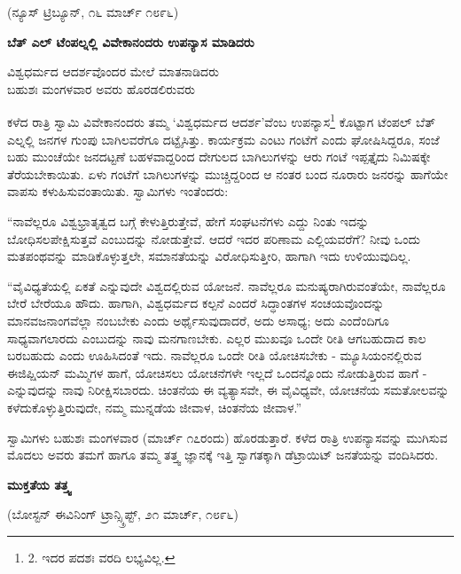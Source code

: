 \begin{center}
(ನ್ಯೂಸ್ ಟ್ರಿಬ್ಯೂನ್, ೧೬ ಮಾರ್ಚ್ ೧೮೯೬)
\end{center}

\begin{center}
\textbf{ಬೆತ್ ಎಲ್ ಟೆಂಪಲ್ನಲ್ಲಿ ವಿವೇಕಾನಂದರು ಉಪನ್ಯಾಸ ಮಾಡಿದರು}
\end{center}

\begin{myquote}
ವಿಶ್ವಧರ್ಮದ ಆದರ್ಶವೊಂದರ ಮೇಲೆ ಮಾತನಾಡಿದರು\\ಬಹುಶಃ ಮಂಗಳವಾರ ಅವರು ಹೊರಡಲಿರುವರು
\end{myquote}

ಕಳೆದ ರಾತ್ರಿ ಸ್ವಾಮಿ ವಿವೇಕಾನಂದರು ತಮ್ಮ ‘ವಿಶ್ವಧರ್ಮದ ಆದರ್ಶ’ವೆಂಬ ಉಪನ್ಯಾಸ\footnote{2. ಇದರ ಪದಶಃ ವರದಿ ಲಭ್ಯವಿಲ್ಲ.} ಕೊಟ್ಟಾಗ ಟೆಂಪಲ್ ಬೆತ್ ಎಲ್ನಲ್ಲಿ ಜನಗಳ ಗುಂಪು ಬಾಗಿಲವರೆಗೂ ದಟ್ಟೈಸಿತ್ತು. ಕಾರ್ಯಕ್ರಮ ಎಂಟು ಗಂಟೆಗೆ ಎಂದು ಘೋಷಿಸಿದ್ದರೂ, ಸಂಜೆ ಬಹು ಮುಂಚೆಯೇ ಜನದಟ್ಟಣೆ ಬಹಳವಾದ್ದರಿಂದ ದೇಗುಲದ ಬಾಗಿಲುಗಳನ್ನು ಆರು ಗಂಟೆ ಇಪ್ಪತ್ತೈದು ನಿಮಿಷಕ್ಕೇ ತೆರೆಯಬೇಕಾಯಿತು. ಏಳು ಗಂಟೆಗೆ ಬಾಗಿಲುಗಳನ್ನು ಮುಚ್ಚಿದ್ದರಿಂದ ಆ ನಂತರ ಬಂದ ನೂರಾರು ಜನರನ್ನು ಹಾಗೆಯೇ ವಾಪಸು ಕಳುಹಿಸುವಂತಾಯಿತು. ಸ್ವಾಮಿಗಳು ಇಂತೆಂದರು:

“ನಾವೆಲ್ಲರೂ ವಿಶ್ವಭ್ರಾತೃತ್ವದ ಬಗ್ಗೆ ಕೇಳುತ್ತಿರುತ್ತೇವೆ, ಹೇಗೆ ಸಂಘಟನೆಗಳು ಎದ್ದು ನಿಂತು ಇದನ್ನು ಬೋಧಿಸಲಪೇಕ್ಷಿಸುತ್ತವೆ ಎಂಬುದನ್ನು ನೋಡುತ್ತೇವೆ. ಆದರೆ ಇದರ ಪರಿಣಾಮ ಎಲ್ಲಿಯವರೆಗೆ? ನೀವು ಒಂದು ಮತಪಂಥವನ್ನು ಮಾಡಿಕೊಳ್ಳುತ್ತಲೇ, ಸಮಾನತೆಯನ್ನು ವಿರೋಧಿಸುತ್ತೀರಿ, ಹಾಗಾಗಿ ಇದು ಉಳಿಯುವುದಿಲ್ಲ.

“ವೈವಿಧ್ಯತೆಯಲ್ಲಿ ಏಕತೆ ಎನ್ನುವುದೇ ವಿಶ್ವದಲ್ಲಿರುವ ಯೋಜನೆ. ನಾವೆಲ್ಲರೂ ಮನುಷ್ಯರಾಗಿರುವಂತೆಯೇ, ನಾವೆಲ್ಲರೂ ಬೇರೆ ಬೇರೆಯೂ ಹೌದು. ಹಾಗಾಗಿ, ವಿಶ್ವಧರ್ಮದ ಕಲ್ಪನೆ ಎಂದರೆ ಸಿದ್ಧಾಂತಗಳ ಸಂಚಯವೊಂದನ್ನು ಮಾನವಜನಾಂಗವೆಲ್ಲಾ ನಂಬಬೇಕು ಎಂದು ಅರ್ಥೈಸುವುದಾದರೆ, ಅದು ಅಸಾಧ್ಯ; ಅದು ಎಂದೆಂದಿಗೂ ಸಾಧ್ಯವಾಗಲಾರದು ಎಂಬುದನ್ನು ನಾವು ಮನಗಾಣಬೇಕು. ಎಲ್ಲರ ಮುಖವೂ ಒಂದೇ ರೀತಿ ಆಗಬಹುದಾದ ಕಾಲ ಬರಬಹುದು ಎಂದು ಊಹಿಸಿದಂತೆ ಇದು. ನಾವೆಲ್ಲರೂ ಒಂದೇ ರೀತಿ ಯೋಚಿಸಬೇಕು - ಮ್ಯೂಸಿಯಂನಲ್ಲಿರುವ ಈಜಿಪ್ಷಿಯನ್ ಮಮ್ಮಿಗಳ ಹಾಗೆ, ಯೋಚಿಸಲು ಯೋಚನೆಗಳೇ ಇಲ್ಲದೆ ಒಂದನ್ನೊಂದು ನೋಡುತ್ತಿರುವ ಹಾಗೆ - ಎನ್ನುವುದನ್ನು ನಾವು ನಿರೀಕ್ಷಿಸಬಾರದು. ಚಿಂತನೆಯ ಈ ವ್ಯತ್ಯಾಸವೇ, ಈ ವೈವಿಧ್ಯವೇ, ಯೋಚನೆಯ ಸಮತೋಲವನ್ನು ಕಳೆದುಕೊಳ್ಳುತ್ತಿರುವುದೇ, ನಮ್ಮ ಮುನ್ನಡೆಯ ಜೀವಾಳ, ಚಿಂತನೆಯ ಜೀವಾಳ.”

ಸ್ವಾಮಿಗಳು ಬಹುಶಃ ಮಂಗಳವಾರ (ಮಾರ್ಚ್ ೧೭ರಂದು) ಹೊರಡುತ್ತಾರೆ. ಕಳೆದ ರಾತ್ರಿ ಉಪನ್ಯಾಸವನ್ನು ಮುಗಿಸುವ ಮೊದಲು ಅವರು ತಮಗೆ ಹಾಗೂ ತಮ್ಮ ತತ್ತ್ವ ಜ್ಞಾನಕ್ಕೆ ಇತ್ತಿ ಸ್ವಾಗತಕ್ಕಾಗಿ ಡೆಟ್ರಾಯಿಟ್ ಜನತೆಯನ್ನು ವಂದಿಸಿದರು.

\begin{center}
\textbf{ಮುಕ್ತತೆಯ ತತ್ತ್ವ}
\end{center}

\begin{center}
(ಬೋಸ್ಟನ್ ಈವಿನಿಂಗ್ ಟ್ರಾನ್ಸ್ಕ್ರಿಪ್ಟ್, ೨೧ ಮಾರ್ಚ್, ೧೮೯೬)
\end{center}

